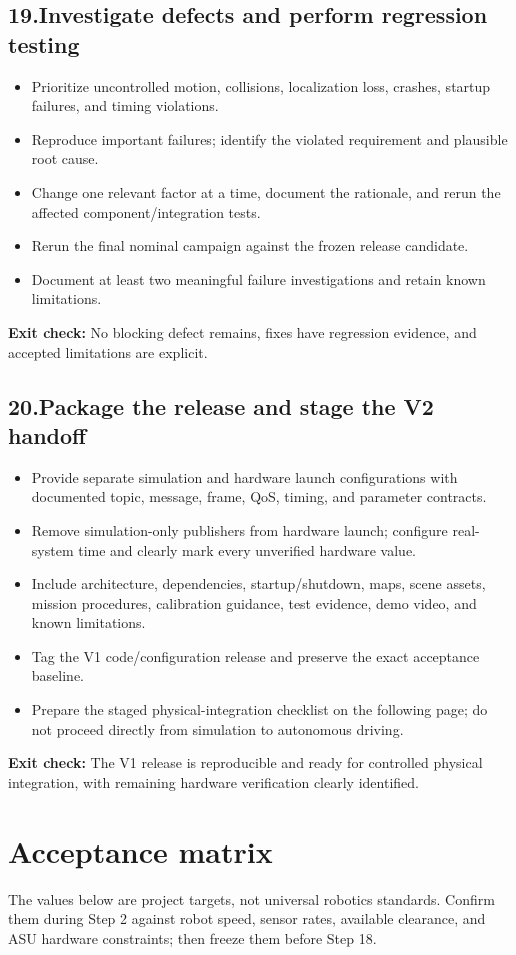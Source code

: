 \documentclass[10pt,a4paper]{article}
\newcommand{\cb}{\(\square\)}
\newcommand{\exitcheck}[1]{\vspace{2pt}\colorbox{PaleTeal}{\parbox{0.965\linewidth}{\textbf{Exit check:} #1}}}
\newcommand{\workstep}[2]{\subsection{\texorpdfstring{#1\quad #2}{#1\ #2}}}
\begin{document}
\workstep{19.}{Investigate defects and perform regression testing}
\begin{itemize}
  \item[\cb] Prioritize uncontrolled motion, collisions, localization loss, crashes, startup failures, and timing violations.
  \item[\cb] Reproduce important failures; identify the violated requirement and plausible root cause.
  \item[\cb] Change one relevant factor at a time, document the rationale, and rerun the affected component/integration tests.
  \item[\cb] Rerun the final nominal campaign against the frozen release candidate.
  \item[\cb] Document at least two meaningful failure investigations and retain known limitations.
\end{itemize}
\exitcheck{No blocking defect remains, fixes have regression evidence, and accepted limitations are explicit.}

\workstep{20.}{Package the release and stage the V2 handoff}
\begin{itemize}
  \item[\cb] Provide separate simulation and hardware launch configurations with documented topic, message, frame, QoS, timing, and parameter contracts.
  \item[\cb] Remove simulation-only publishers from hardware launch; configure real-system time and clearly mark every unverified hardware value.
  \item[\cb] Include architecture, dependencies, startup/shutdown, maps, scene assets, mission procedures, calibration guidance, test evidence, demo video, and known limitations.
  \item[\cb] Tag the V1 code/configuration release and preserve the exact acceptance baseline.
  \item[\cb] Prepare the staged physical-integration checklist on the following page; do not proceed directly from simulation to autonomous driving.
\end{itemize}
\exitcheck{The V1 release is reproducible and ready for controlled physical integration, with remaining hardware verification clearly identified.}

\newpage
\section{Acceptance matrix}

The values below are project targets, not universal robotics standards. Confirm them during Step 2 against robot speed, sensor rates, available clearance, and ASU hardware constraints; then freeze them before Step 18.
\end{document}
